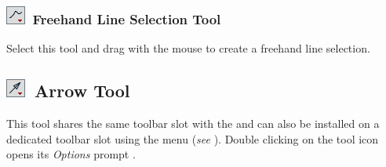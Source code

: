 

\subsubsection[Freehand Line Selection Tool]{\protect\includegraphics[bb=0bp 5bp 20bp 20bp,scale=0.6]{images/tools/FreehandLine}~Freehand
Line Selection Tool\label{sub:Freehand-Line-Selection}\improvement{}}

Select this tool and drag with the mouse to create a freehand line
selection.




\subsection[Arrow Tool]{\noindent \protect\includegraphics[bb=0bp 5bp 20bp 20bp,scale=0.6]{images/tools/Arrow}~Arrow
Tool\label{sec:Arrow-Tool}\textmd{}}

\noindent This tool shares the same toolbar slot with the 
and can also be installed on a dedicated toolbar slot using the 
menu (\emph{see} ). Double clicking on the
tool icon opens its \emph{Options} prompt \cite{C-ArrowTool}. 

